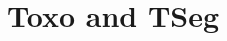 \documentclass[./dissertation.tex]{subfiles}
\begin{document}
\chapter{Toxo and TSeg}





















\end{document}
